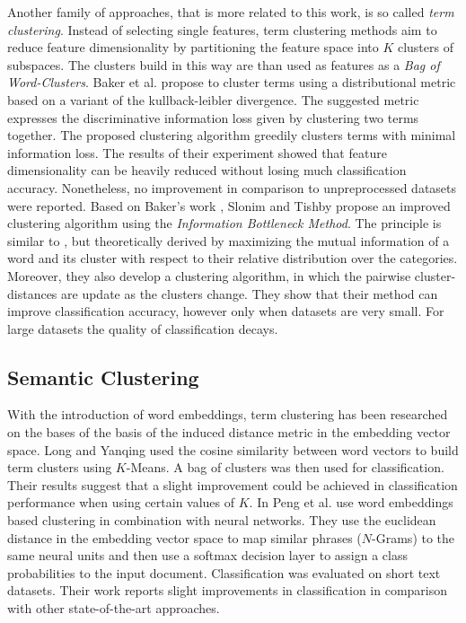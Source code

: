  Another family of approaches, that is more related to this work, is so called
 \emph{term clustering}. Instead of selecting single features, term clustering methods aim
 to reduce feature dimensionality by partitioning the feature space into
 $K$ clusters of subspaces. The clusters build in this way are than used as
 features as a \emph{Bag of Word-Clusters}. Baker et al.
 \cite{baker1998distributional} propose to cluster terms using a distributional metric based on a variant of the
 kullback-leibler divergence. The suggested metric expresses the discriminative
 information loss given by clustering two terms together.
 The proposed clustering algorithm greedily clusters terms with minimal
 information loss. The results of their experiment showed that feature
 dimensionality can be heavily reduced without losing much classification accuracy.
 Nonetheless, no improvement in comparison to unpreprocessed datasets were
 reported. Based on Baker's work \cite{baker1998distributional},
 Slonim and Tishby \cite{slonim2001power} propose an improved clustering
 algorithm using the \emph{Information Bottleneck Method}. The principle is similar to
 \cite{baker1998distributional}, but theoretically derived by maximizing the
 mutual information of a word and its cluster with respect to their relative
 distribution over the categories. Moreover, they also develop a clustering
 algorithm, in which the pairwise cluster-distances are update as the clusters
 change.
 They show that their method can improve classification accuracy, however only when datasets are very small. 
 For large datasets the quality of classification decays.

 \subsection{Semantic Clustering}
 
 With the introduction of word embeddings, term clustering has been researched
 on the bases of the basis of the induced distance metric in the embedding
 vector space. Long and Yanqing \cite{ma2015using} used the cosine similarity
 between word vectors to build term clusters using $K$-Means. A bag of clusters
 was then used for classification. Their results suggest that a slight
 improvement could be achieved in classification performance when using certain values of $K$.
 In \cite{wang2016semantic} Peng et al. use word embeddings based clustering in
 combination with neural networks. They use the euclidean distance in the
 embedding vector space to map similar phrases ($N$-Grams) to the same neural
 units and then use a softmax decision layer to assign a class probabilities to
 the input document. Classification was evaluated on short text datasets.
 Their work reports slight improvements in classification in comparison
 with other state-of-the-art approaches.
 
